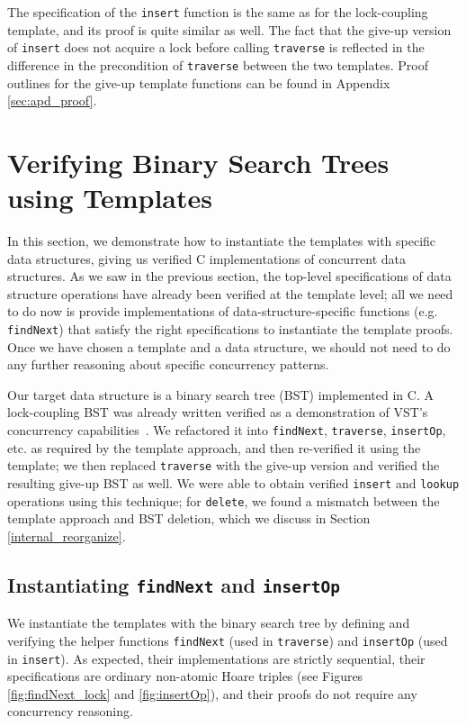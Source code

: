 \documentclass[sigplan,10pt,anonymous,review]{acmart}\settopmatter{printfolios=true,printccs=false,printacmref=false}
\begin{document}
The specification of the \lstinline{insert} function is the same as for the lock-coupling template, and its proof is quite similar as well. The fact that the give-up version of \lstinline{insert} does not acquire a lock before calling \lstinline{traverse} is reflected in the difference in the precondition of \lstinline{traverse} between the two templates. Proof outlines for the give-up template functions can be found in Appendix \ref{sec:apd_proof}.

\section{Verifying Binary Search Trees using Templates}
\label{BST_proof}
In this section, we demonstrate how to instantiate the templates with specific data structures, giving us verified C implementations of concurrent data structures. 
As we saw in the previous section, the top-level specifications of data structure operations have already been verified at the template level; all we need to do now is provide implementations of data-structure-specific functions (e.g. \lstinline{findNext}) that satisfy the right specifications to instantiate the template proofs. Once we have chosen a template and a data structure, we should not need to do any further reasoning about specific concurrency patterns.

Our target data structure is a binary search tree (BST) implemented in C. A lock-coupling BST was already written verified as a demonstration of VST's concurrency capabilities~\cite{bst-conc}. We refactored it into \lstinline{findNext}, \lstinline{traverse}, \lstinline{insertOp}, etc. as required by the template approach, and then re-verified it using the template; we then replaced \lstinline{traverse} with the give-up version and verified the resulting give-up BST as well. We were able to obtain verified \lstinline{insert} and \lstinline{lookup} operations using this technique; for \texttt{delete}, we found a mismatch between the template approach and BST deletion, which we discuss in Section \ref{internal_reorganize}.

\subsection{Instantiating \lstinline{findNext} and \lstinline{insertOp}}
We instantiate the templates with the binary search tree by defining and verifying the helper functions \texttt{findNext} (used in \lstinline{traverse}) and \texttt{insertOp} (used in \texttt{insert}). As expected, their implementations are strictly sequential, their specifications are ordinary non-atomic Hoare triples (see Figures \ref{fig:findNext_lock} and \ref{fig:insertOp}), and their proofs do not require any concurrency reasoning.
\end{document}
